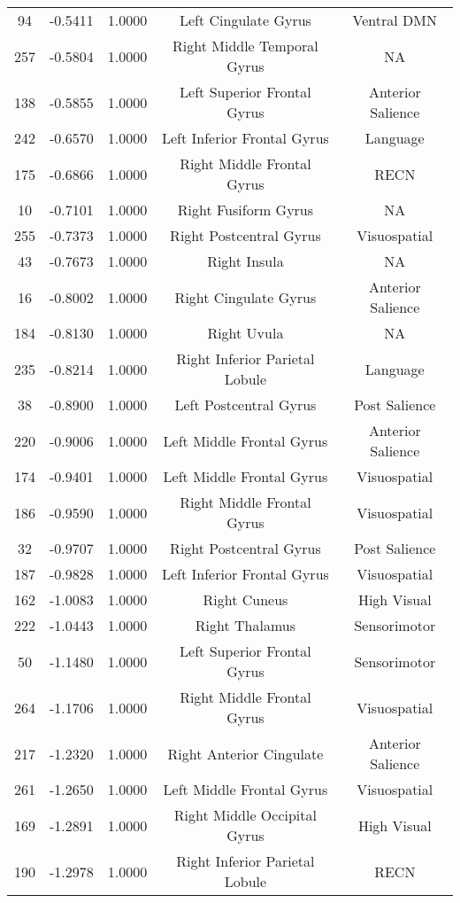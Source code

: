 \documentclass[10pt,letterpaper]{article}\usepackage[]{graphicx}\usepackage[]{color}
\begin{document}
\begin{center}
\begin{longtable}[c]{ccccc}
	94	& -0.5411 & 1.0000 & Left Cingulate Gyrus & Ventral DMN \\
	257	& -0.5804 & 1.0000 & Right Middle Temporal Gyrus & NA \\
	138	& -0.5855 & 1.0000 & Left Superior Frontal Gyrus & Anterior Salience \\
	242	& -0.6570 & 1.0000 & Left Inferior Frontal Gyrus & Language \\
	175	& -0.6866 & 1.0000 & Right Middle Frontal Gyrus & RECN \\
	10	& -0.7101 & 1.0000 & Right Fusiform Gyrus & NA \\
	255	& -0.7373 & 1.0000 & Right Postcentral Gyrus & Visuospatial \\
	43	& -0.7673 & 1.0000 & Right Insula & NA \\
	16	& -0.8002 & 1.0000 & Right Cingulate Gyrus & Anterior Salience \\
	184	& -0.8130 & 1.0000 & Right Uvula & NA \\
	235	& -0.8214 & 1.0000 & Right Inferior Parietal Lobule & Language \\
	38	& -0.8900 & 1.0000 & Left Postcentral Gyrus & Post Salience \\
	220	& -0.9006 & 1.0000 & Left Middle Frontal Gyrus & Anterior Salience \\
	174	& -0.9401 & 1.0000 & Left Middle Frontal Gyrus & Visuospatial \\
	186	& -0.9590 & 1.0000 & Right Middle Frontal Gyrus & Visuospatial \\
	32	& -0.9707 & 1.0000 & Right Postcentral Gyrus & Post Salience \\
	187	& -0.9828 & 1.0000 & Left Inferior Frontal Gyrus & Visuospatial \\
	162	& -1.0083 & 1.0000 & Right Cuneus & High Visual \\
	222	& -1.0443 & 1.0000 & Right Thalamus & Sensorimotor \\
	50	& -1.1480 & 1.0000 & Left Superior Frontal Gyrus & Sensorimotor \\
	264	& -1.1706 & 1.0000 & Right Middle Frontal Gyrus & Visuospatial \\
	217	& -1.2320 & 1.0000 & Right Anterior Cingulate & Anterior Salience \\
	261	& -1.2650 & 1.0000 & Left Middle Frontal Gyrus & Visuospatial \\
	169	& -1.2891 & 1.0000 & Right Middle Occipital Gyrus & High Visual \\
	190	& -1.2978 & 1.0000 & Right Inferior Parietal Lobule & RECN \\
\end{longtable}
\end{center}
\end{document}
